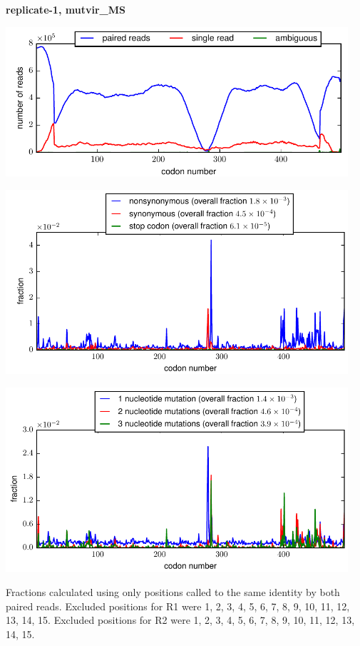 \documentclass[10pt,letterpaper]{article}
\begin{document}
\centerline{\Large \bf replicate-1, mutvir\_MS}
\vspace{0.1in}

\centerline{\includegraphics[width=5in]{replicate-1-mutvir_MS_codondepth.pdf}}
\vspace{0.1in}

\centerline{\includegraphics[width=5in]{replicate-1-mutvir_MS_syn-ns-dist.pdf}}
\vspace{0.1in}

\centerline{\includegraphics[width=5in]{replicate-1-mutvir_MS_nmutspercodon-dist.pdf}}
\vspace{0.1in}

Fractions calculated using only positions called to the same identity by both paired reads.  Excluded positions for R1 were 1, 2, 3, 4, 5, 6, 7, 8, 9, 10, 11, 12, 13, 14, 15. 
 Excluded positions for R2 were 1, 2, 3, 4, 5, 6, 7, 8, 9, 10, 11, 12, 13, 14, 15. 
\end{document}

